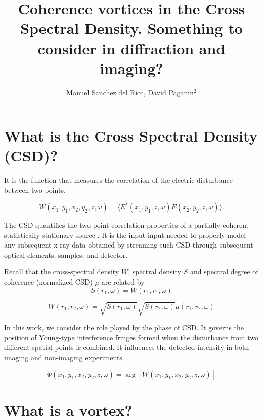 \documentclass[a4paper,10pt]{article}
\title{Coherence vortices in the Cross Spectral Density. Something to consider in diffraction and imaging?}
\author{Manuel Sanchez del Rio$^1$, David Paganin$^2$}
\begin{document}
\maketitle

\begin{abstract}

\end{abstract}

\section{What is the Cross Spectral Density (CSD)?}

It is the function that measures the correlation of the electric disturbance between two points.

\begin{equation}
W(x_1,y_1,x_2,y_2,z,\omega) = 
\langle E^{*}(x_1,y_1,z,\omega) E(x_2,y_2,z,\omega)\rangle.
\end{equation}

The CSD quantifies the two-point correlation properties of a partially coherent statistically stationary source \cite{Wolf1982,mandel_wolf}. 
It is the input input needed to properly model any subsequent x-ray data obtained by streaming such CSD through subsequent optical elements, samples, and detector.

Recall that the cross-spectral density $W$, spectral density $S$ and spectral degree of coherence (normalized CSD) $\mu$ are related by 
\begin{equation}
S(r_1,\omega) = W(r_1,r_1,\omega) 
\end{equation}

\begin{equation}
W(r_1,r_2,\omega)=\sqrt{S(r_1,\omega)}\sqrt{S(r_2,\omega)}\mu(r_1,r_2,\omega)
\end{equation}

In this work, we consider the role played by the phase of CSD. It governs the position of Young-type interference fringes formed when the disturbance from two different spatial points is combined. It influences the detected intensity in both imaging and non-imaging experiments.

\begin{equation}\label{phase_of_W}
\Phi(x_1,y_1,x_2,y_2,z,\omega)=\arg[W(x_1,y_1,x_2,y_2,z,\omega)]
\end{equation}




\section{What is a vortex?}
\end{document}
